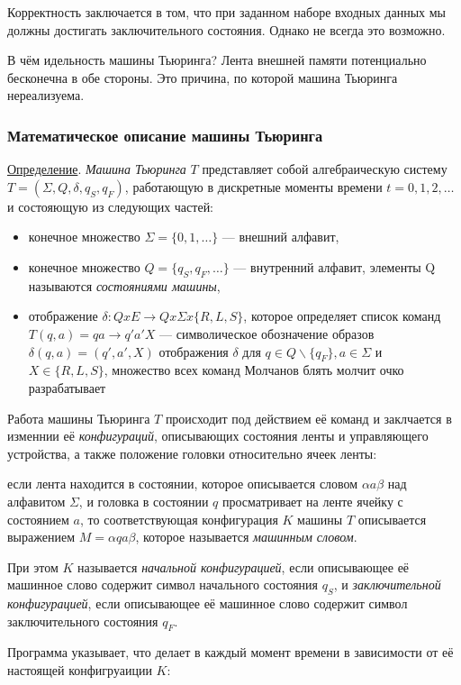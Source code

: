 \documentclass{article}
\begin{document}
Корректность заключается в том, что при заданном наборе входных данных мы должны достигать заключительного состояния. Однако не всегда это возможно.

В чём идельность машины Тьюринга? Лента внешней памяти потенциально бесконечна в обе стороны. Это причина, по которой машина Тьюринга нереализуема.

\subsubsection{Математическое описание машины Тьюринга}
\underline{Определение}. \textit{Машина Тьюринга} $T$ представляет собой алгебраическую систему $T=(\Sigma, Q, \delta, q_S, q_F)$, работающую в дискретные моменты времени $t=0,1,2,\dots$ и состояющую из следующих частей:
\begin{itemize}
    \item конечное множество $\Sigma=\{0,1,\dots\}$ --- внешний алфавит,
    \item конечное множество $Q = \{q_S, q_F, \dots\}$ --- внутренний алфавит, элементы Q называются \textit{состояниями машины},
    \item отображение $\delta: Q x E \to Q x \Sigma x \{R, L, S\}$, которое определяет список команд $T(q, a) = qa \to q'a'X$ --- символическое обозначение образов $\delta(q, a) = (q',a',X)$ отображения $\delta$ для $q \in Q \backslash \{q_F\}, a \in \Sigma$ и $X \in \{R, L, S\}$, множество всех команд Молчанов блять молчит очко разрабатывает
\end{itemize}

Работа машины Тьюринга $T$ происходит под действием её команд и заклчается в изменнии её \textit{конфигураций}, описывающих состояния ленты и управляющего устройства, а также положение головки относительно ячеек ленты:

если лента находится в состоянии, которое описывается словом $\alpha a \beta$ над алфавитом $\Sigma$, и головка в состоянии $q$ просматривает на ленте ячейку с состоянием $a$, то соответствующая конфигурация $K$ машины $T$ описывается выражением $M = \alpha q a  \beta$, которое называется \textit{машинным словом}.

При этом $K$ называется \textit{начальной конфигурацией}, если описывающее её машинное слово содержит символ начального состояния $q_S$, и \textit{заключительной конфигурацией}, если описывающее её машинное слово содержит символ заключительного состояния $q_F$.

Программа указывает, что делает в каждый момент времени в зависимости от её настоящей конфигруаиции $K$:
\end{document}
